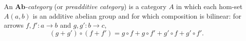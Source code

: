 An \emph{$\mathbf{Ab}$-category} (or \emph{preadditive category}) is a category $A$ in which each hom-set $A(a, b)$ is an additive abelian group and for which composition is bilinear: for arrows $f, f': a \to b$ and $g, g': b \to c$,
$$(g + g') \circ (f + f') = g \circ f + g \circ f' + g' \circ f + g' \circ f'.$$
